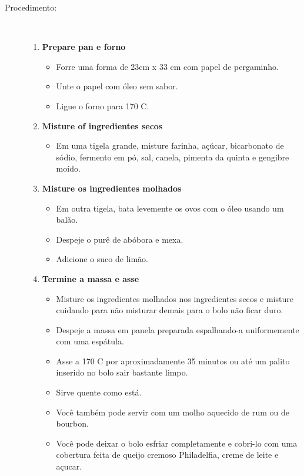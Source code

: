 \documentclass [11pt, letterpaper] {article}
\begin{document}
\begin {description}
\item [Procedimento:] \ \\
\begin {enumerate}
\item {\bf Prepare pan e forno}
\begin {itemize}
\item Forre uma forma de 23cm x 33 cm com papel de pergaminho.
\item Unte o papel com \'oleo sem sabor.
\item Ligue o forno para 170 C.
\end {itemize}
\item {\bf Misture of ingredientes secos}
\begin {itemize}
\item Em uma tigela grande, misture farinha, açúcar, bicarbonato de sódio, fermento em pó, sal, canela, pimenta da quinta e gengibre moído.
\end {itemize}
\item {\bf Misture os ingredientes molhados}
\begin {itemize}
        \item Em outra tigela, bata levemente os ovos com o óleo usando um bal\~ao.
\item Despeje o purê de abóbora e mexa.
\item Adicione o suco de limão.
\end {itemize}
\item {\bf Termine a massa e asse}
\begin {itemize}
\item Misture os ingredientes molhados nos ingredientes secos e misture cuidando para n\~ao misturar demais para o bolo n\~ao ficar duro.
\item Despeje a massa em panela preparada espalhando-a uniformemente com uma espátula.
\item Asse a 170 C por aproximadamente 35 minutos ou até um palito inserido no bolo sair bastante limpo.
\item Sirve quente como está.
\item Você também pode servir com um molho aquecido de rum ou de bourbon.
\item Você pode deixar o bolo esfriar completamente e cobri-lo com uma cobertura feita de queijo cremoso Philadelfia, creme de leite e a\c{c}ucar.  
 \end {itemize}
     \end {enumerate}
\end {description}
\end{document}
